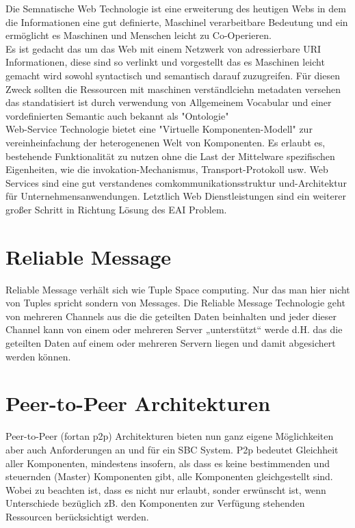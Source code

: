 \documentclass[a4paper,12pt]{scrreprt}
\begin{document}
		
	
		
		Die Semnatische Web Technologie ist eine erweiterung des heutigen Webs in dem die Informationen eine gut definierte, Maschinel verarbeitbare Bedeutung und ein ermöglicht es Maschinen und Menschen leicht zu Co-Operieren.\\
		Es ist gedacht das um das Web mit einem Netzwerk von adressierbare URI Informationen, diese sind so verlinkt und vorgestellt das es Maschinen leicht gemacht wird sowohl syntactisch und semantisch darauf zuzugreifen.
		Für diesen Zweck sollten die Ressourcen mit maschinen verständlciehn metadaten versehen das standatisiert ist durch verwendung von Allgemeinem Vocabular und einer vordefinierten Semantic auch bekannt als "Ontologie"
		\\
	

		
			
		
		
		Web-Service Technologie bietet eine 
		"Virtuelle Komponenten-Modell" zur vereinheinfachung der 
		heterogenenen Welt von Komponenten. Es  erlaubt es, bestehende Funktionalität zu nutzen 
		ohne die Last der Mittelware spezifischen Eigenheiten, wie die invokation-Mechanismus, Transport-Protokoll usw. Web Services sind eine gut verstandenes comkommunikationsstruktur und-Architektur für Unternehmensanwendungen. Letztlich Web 
		Dienstleistungen sind ein weiterer großer Schritt in Richtung 
		Lösung des EAI Problem.
		
		\section{Reliable Message}
			
			Reliable Message verhält sich wie Tuple Space computing. Nur das man hier nicht von Tuples spricht sondern von Messages.  Die Reliable Message Technologie geht von mehreren Channels aus die die geteilten Daten beinhalten und jeder dieser Channel kann von einem oder mehreren Server „unterstützt“ werde d.H.  das die geteilten Daten auf einem oder mehreren Servern liegen und damit abgesichert werden können. 
		
		\section{Peer-to-Peer Architekturen}
			
			Peer-to-Peer (fortan p2p) Architekturen bieten nun ganz eigene Möglichkeiten aber auch Anforderungen an und für ein SBC System. P2p bedeutet Gleichheit aller Komponenten, mindestens insofern, als dass es keine bestimmenden und steuernden (Master) Komponenten gibt, alle Komponenten gleichgestellt sind. Wobei zu beachten ist, dass es nicht nur erlaubt, sonder erwünscht ist, wenn Unterschiede bezüglich zB. den Komponenten zur Verfügung stehenden Ressourcen berücksichtigt werden. 
			
\end{document}
